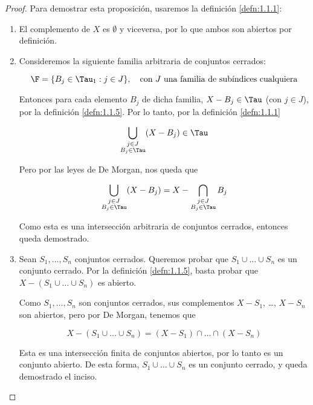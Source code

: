 \begin{proof}
    Para demostrar esta proposición, usaremos la definición \ref{defn:1.1.1}:
    
    \begin{enumerate}
        \item El complemento de $X$ es $\emptyset$ y viceversa, por lo que ambos son abiertos por definición.
        \item Consideremos la siguiente familia arbitraria de conjuntos cerrados:
        
        \[
        \F = \{B_j \in \Tau_1 : j \in J\}, \quad \text{con $J$ una familia de subíndices cualquiera}
        \]
        
        Entonces para cada elemento $B_j$ de dicha familia, $X - B_j \in \Tau$ (con $j \in J$), por la definición \ref{defn:1.1.5}. Por lo tanto, por la definición \ref{defn:1.1.1}
        
        \[
        \bigcup_{\substack{j \in J \\ B_j \in \Tau}} (X - B_j) \in \Tau
        \]
        
        Pero por las leyes de De Morgan, nos queda que
        
        \[
        \bigcup_{\substack{j \in J \\ B_j \in \Tau}} (X - B_j) = X - \bigcap_{\substack{j \in J \\ B_j \in \Tau}} B_j
        \]
        
        Como esta es una intersección arbitraria de conjuntos cerrados, entonces queda demostrado.
        \item Sean $S_1, \dots, S_n$ conjuntos cerrados. Queremos probar que $S_1 \cup \dots \cup S_n$ es un conjunto cerrado. Por la definición \ref{defn:1.1.5}, basta probar que $X - (S_1 \cup \dots \cup S_n)$ es abierto.
        
        Como $S_1, \dots, S_n$ son conjuntos cerrados, sus complementos $X - S_1$, \dots, $X - S_n$ son abiertos, pero por De Morgan, tenemos que
        
        \[
        X - (S_1 \cup \dots \cup S_n) = (X - S_1) \cap \dots \cap (X - S_n)
        \]
        
        Esta es una intersección finita de conjuntos abiertos, por lo tanto es un conjunto abierto. De esta forma, $S_1 \cup \dots \cup S_n$ es un conjunto cerrado, y queda demostrado el inciso.
    \end{enumerate}
\end{proof}